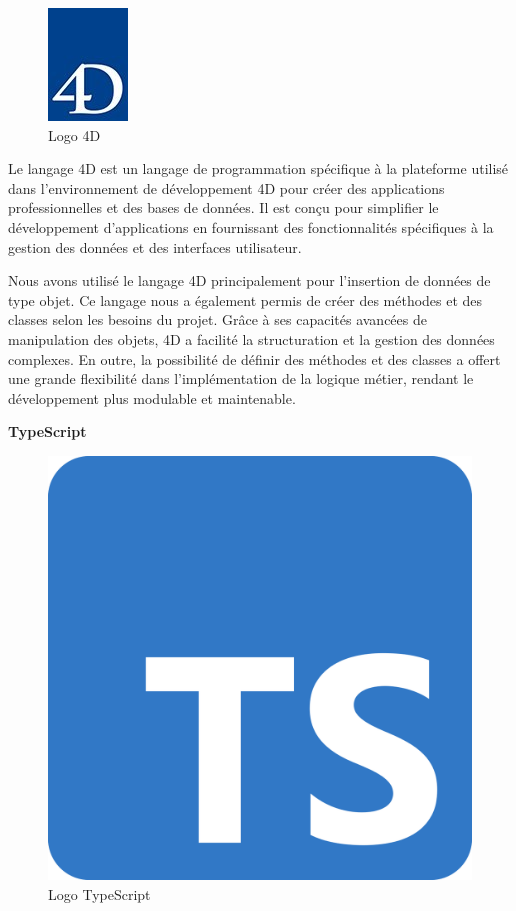 \begin{figure}[htbp]
   \centering
   \includegraphics[scale=0.8]{Images/logo-4d.jpg} 
   \caption{Logo 4D\cite{4d}}
   \label{fig:4D}
\end{figure}
Le langage 4D est un langage de programmation spécifique à la
plateforme utilisé dans l’environnement de développement 4D pour
créer des applications professionnelles et des bases de données. 
Il est conçu pour simplifier le développement d’applications 
en fournissant des fonctionnalités spécifiques à la gestion des 
données et des interfaces utilisateur\cite{4d}. 
\newline

Nous avons utilisé le langage 4D principalement pour l'insertion de données de type objet. Ce langage nous a également permis de créer des méthodes et des classes selon les besoins du projet. Grâce à ses capacités avancées de manipulation des objets, 4D a facilité la structuration et la gestion des données complexes. En outre, la possibilité de définir des méthodes et des classes a offert une grande flexibilité dans l'implémentation de la logique métier, rendant le développement plus modulable et maintenable.
\newline

\large 
\textbf{TypeScript}
\begin{figure}[h]
   \centering
   \includegraphics[scale=0.05]{Images/ts.png} 
   \caption{Logo TypeScript\cite{TypeScript}}
   \label{fig:ts}
\end{figure}

